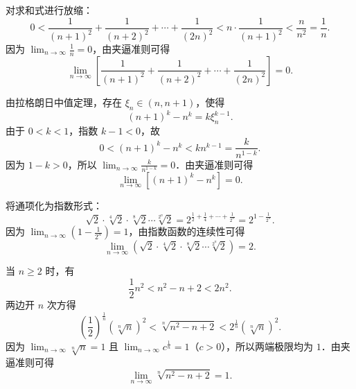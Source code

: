 \begin{solution}

    对求和式进行放缩：
    \begin{equation}
        0 < \frac{1}{(n+1)^2} + \frac{1}{(n+2)^2} + \cdots + \frac{1}{(2n)^2} < n \cdot \frac{1}{(n+1)^2} < \frac{n}{n^2} = \frac{1}{n}.
    \end{equation}
    因为 $\lim_{n\to\infty} \frac{1}{n} = 0$，由夹逼准则可得
    \begin{equation}
        \boxed{\lim_{n\to\infty} \left[ \frac{1}{(n+1)^2} + \frac{1}{(n+2)^2} + \cdots + \frac{1}{(2n)^2} \right] = 0.}
    \end{equation}


    由拉格朗日中值定理，存在 $\xi_n \in (n, n+1)$，使得
    \begin{equation}
        (n+1)^k - n^k = k \xi_n^{k-1}.
    \end{equation}
    由于 $0 < k < 1$，指数 $k - 1 < 0$，故
    \begin{equation}
        0 < (n+1)^k - n^k < k n^{k-1} = \frac{k}{n^{1-k}}.
    \end{equation}
    因为 $1 - k > 0$，所以 $\lim_{n\to\infty} \frac{k}{n^{1-k}} = 0$．由夹逼准则可得
    \begin{equation}
        \boxed{\lim_{n\to\infty} \left[ (n+1)^k - n^k \right] = 0.}
    \end{equation}


    将通项化为指数形式：
    \begin{equation}
        \sqrt{2} \cdot \sqrt[4]{2} \cdot \sqrt[8]{2} \cdots \sqrt[2^n]{2} = 2^{\frac{1}{2} + \frac{1}{4} + \cdots + \frac{1}{2^n}} = 2^{1 - \frac{1}{2^n}}.
    \end{equation}
    因为 $\lim_{n\to\infty} \left( 1 - \frac{1}{2^n} \right) = 1$，由指数函数的连续性可得
    \begin{equation}
        \boxed{\lim_{n\to\infty} \left( \sqrt{2} \cdot \sqrt[4]{2} \cdot \sqrt[8]{2} \cdots \sqrt[2^n]{2} \right) = 2.}
    \end{equation}


    当 $n \geqslant 2$ 时，有
    \begin{equation}
        \frac{1}{2} n^2 < n^2 - n + 2 < 2n^2.
    \end{equation}
    两边开 $n$ 次方得
    \begin{equation}
        \left( \frac{1}{2} \right)^{\frac{1}{n}} (\sqrt[n]{n})^2 < \sqrt[n]{n^2 - n + 2} < 2^{\frac{1}{n}} (\sqrt[n]{n})^2.
    \end{equation}
    因为 $\lim_{n\to\infty} \sqrt[n]{n} = 1$ 且 $\lim_{n\to\infty} c^{\frac{1}{n}} = 1$（$c > 0$），所以两端极限均为 $1$．由夹逼准则可得
    \begin{equation}
        \boxed{\lim_{n\to\infty} \sqrt[n]{n^2 - n + 2} = 1.}
    \end{equation}


\end{solution}
